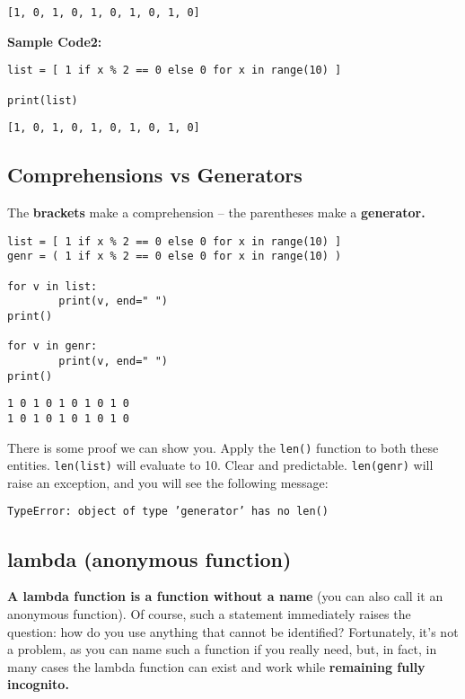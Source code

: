 \documentclass[11pt]{article}
\begin{document}
\begin{verbatim}
[1, 0, 1, 0, 1, 0, 1, 0, 1, 0]
\end{verbatim}

\vspace{10 mm}

\textbf{Sample Code2:}
\begin{verbatim}
list = [ 1 if x % 2 == 0 else 0 for x in range(10) ]

print(list)
\end{verbatim}

\begin{verbatim}
[1, 0, 1, 0, 1, 0, 1, 0, 1, 0]
\end{verbatim}

\newpage

\subsection{Comprehensions vs Generators}
\label{sec:org5e85039}
The \textbf{brackets} make a comprehension – the parentheses make a \textbf{generator.}

\begin{verbatim}
list = [ 1 if x % 2 == 0 else 0 for x in range(10) ]
genr = ( 1 if x % 2 == 0 else 0 for x in range(10) )

for v in list:
        print(v, end=" ")
print()

for v in genr:
        print(v, end=" ")
print()
\end{verbatim}

\begin{verbatim}
1 0 1 0 1 0 1 0 1 0 
1 0 1 0 1 0 1 0 1 0 
\end{verbatim}

There is some proof we can show you. Apply the \texttt{len()} function to both
these entities. \texttt{len(list)} will evaluate to 10. Clear and predictable.
\texttt{len(genr)} will raise an exception, and you will see the following
message:

\texttt{TypeError: object of type 'generator' has no len()}

\subsection{lambda (anonymous function)}
\label{sec:org797a463}
\textbf{A lambda function is a function without a name} (you can also call it
an anonymous function). Of course, such a statement immediately raises
the question: how do you use anything that cannot be identified?
Fortunately, it’s not a problem, as you can name such a function if
you really need, but, in fact, in many cases the lambda function can
exist and work while \textbf{remaining fully incognito.}
\end{document}
